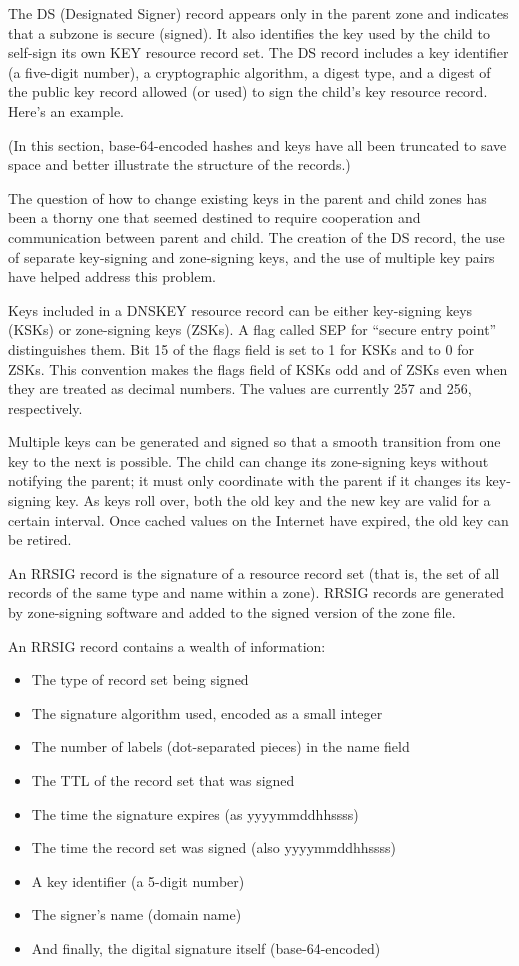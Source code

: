 The DS (Designated Signer) record appears only in the parent zone and
indicates that a subzone is secure (signed). It also identifies the key
used by the child to self-sign its own KEY resource record set. The DS
record includes a key identifier (a five-digit number), a cryptographic
algorithm, a digest type, and a digest of the public key record allowed
(or used) to sign the child's key resource record. Here's an example.


(In this section, base-64-encoded hashes and keys have all been
truncated to save space and better illustrate the structure of the
records.)

The question of how to change existing keys in the parent and child
zones has been a thorny one that seemed destined to require cooperation
and communication between parent and child. The creation of the DS
record, the use of separate key-signing and zone-signing keys, and the
use of multiple key pairs have helped address this problem.

Keys included in a DNSKEY resource record can be either key-signing keys
(KSKs) or zone-signing keys (ZSKs). A flag called SEP for ``secure entry
point'' distinguishes them. Bit 15 of the flags field is set to 1 for
KSKs and to 0 for ZSKs. This convention makes the flags field of KSKs
odd and of ZSKs even when they are treated as decimal numbers. The
values are currently 257 and 256, respectively.

Multiple keys can be generated and signed so that a smooth transition
from one key to the next is possible. The child can change its
zone-signing keys without notifying the parent; it must only coordinate
with the parent if it changes its key-signing key. As keys roll over,
both the old key and the new key are valid for a certain interval. Once
cached values on the Internet have expired, the old key can be retired.

An RRSIG record is the signature of a resource record set (that is, the
set of all records of the same type and name within a zone). RRSIG
records are generated by zone-signing software and added to the signed
version of the zone file.

An RRSIG record contains a wealth of information:

\begin{itemize}
\item
  The type of record set being signed
\item
  The signature algorithm used, encoded as a small integer
\item
  The number of labels (dot-separated pieces) in the name field
\item
  The TTL of the record set that was signed
\item
  The time the signature expires (as {yyyymmddhhssss})
\item
  The time the record set was signed (also {yyyymmddhhssss})
\item
  A key identifier (a 5-digit number)
\item
  The signer's name (domain name)
\item
  And finally, the digital signature itself (base-64-encoded)
\end{itemize}


